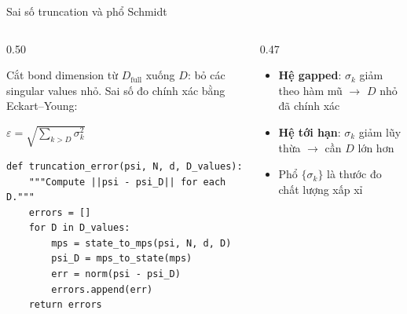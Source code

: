 \documentclass[aspectratio=169, 11pt]{beamer}
\newcommand{\eqn}[1]{\begin{center}\colorbox{eqbox}{\color{qcyan}$\displaystyle #1$}\end{center}}
\begin{document}
\begin{frame}[fragile, shrink=3]{Sai số truncation và phổ Schmidt}

\begin{columns}[T]
\begin{column}{0.50\textwidth}

{\small Cắt bond dimension từ $D_\text{full}$ xuống $D$: bỏ các singular values nhỏ. Sai số đo chính xác bằng Eckart--Young:}
\eqn{\varepsilon = \sqrt{\textstyle\sum_{k>D}\sigma_k^2}}

\vspace{4pt}
\begin{lstlisting}
def truncation_error(psi, N, d, D_values):
    """Compute ||psi - psi_D|| for each D."""
    errors = []
    for D in D_values:
        mps = state_to_mps(psi, N, d, D)
        psi_D = mps_to_state(mps)
        err = norm(psi - psi_D)
        errors.append(err)
    return errors
\end{lstlisting}

\end{column}
\begin{column}{0.47\textwidth}

\vspace{2pt}
\begin{center}
\end{center}

\vspace{4pt}
{\small
\begin{itemize}
  \item \textbf{Hệ gapped}: $\sigma_k$ giảm theo hàm mũ $\to$ $D$ nhỏ đã chính xác
  \item \textbf{Hệ tới hạn}: $\sigma_k$ giảm lũy thừa $\to$ cần $D$ lớn hơn
  \item Phổ $\{\sigma_k\}$ là thước đo chất lượng xấp xỉ
\end{itemize}}

\end{column}
\end{columns}

\end{frame}
\end{document}
